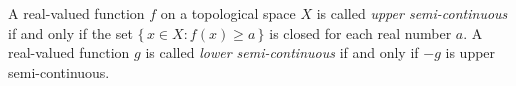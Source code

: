 A real-valued function $f$ on a topological space $X$ is called \emph{upper semi-continuous} if and only if the set $\{\, x \in X : f(x) \geq a \,\}$ is closed for each real number $a$. A real-valued function $g$ is called \emph{lower semi-continuous} if and only if $-g$ is upper semi-continuous.
